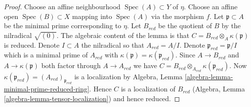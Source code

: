 \documentclass[10pt,a4paper]{amsart}
\theoremstyle{plain}
\theoremstyle{definition}
\theoremstyle{remark}
\numberwithin{equation}{subsection}
\def\Spec{\mathop{\mathrm{Spec}}}
\begin{document}
\begin{proof}
Choose an affine neighbourhood $\Spec(A) \subset Y$ of $\eta$.
Choose an affine open $\Spec(B) \subset X$ mapping into $\Spec(A)$
via the morphism $f$. Let $\mathfrak p \subset A$ be the minimal prime
corresponding to $\eta$. Let $B_{red}$ be the quotient of $B$ by
the nilradical $\sqrt{(0)}$. The algebraic content of the lemma is that
$C = B_{red} \otimes_A \kappa(\mathfrak p)$ is reduced.
Denote $I \subset A$ the nilradical so that $A_{red} = A/I$.
Denote $\mathfrak p_{red} = \mathfrak p/I$
which is a minimal prime of $A_{red}$ with
$\kappa(\mathfrak p) = \kappa(\mathfrak p_{red})$.
Since $A \to B_{red}$ and $A \to \kappa(\mathfrak p)$
both factor through $A \to A_{red}$ we have
$C = B_{red} \otimes_{A_{red}} \kappa(\mathfrak p_{red})$.
Now $\kappa(\mathfrak p_{red}) = (A_{red})_{\mathfrak p_{red}}$
is a localization by 
Algebra, Lemma \ref{algebra-lemma-minimal-prime-reduced-ring}.
Hence $C$ is a localization of $B_{red}$
(Algebra, Lemma \ref{algebra-lemma-tensor-localization})
and hence reduced.
\end{proof}
\end{document}
